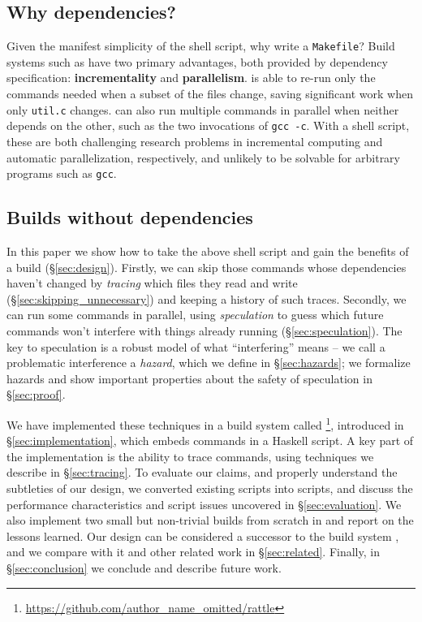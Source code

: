 \subsection{Why dependencies?}

Given the manifest simplicity of the shell script, why write a \texttt{Makefile}? Build systems such as \Make have two primary advantages, both provided by dependency specification: \textbf{incrementality} and \textbf{parallelism}. \Make is able to re-run only the commands needed when a subset of the files change, saving significant work when only \texttt{util.c} changes. \Make can also run multiple commands in parallel when neither depends on the other, such as the two invocations of \texttt{gcc -c}. With a shell script, these are both challenging research problems in incremental computing and automatic parallelization, respectively, and unlikely to be solvable for arbitrary programs such as \texttt{gcc}.

\subsection{Builds without dependencies}

In this paper we show how to take the above shell script and gain the benefits of a \Make build (\S\ref{sec:design}). Firstly, we can skip those commands whose dependencies haven't changed by \emph{tracing} which files they read and write (\S\ref{sec:skipping_unnecessary}) and keeping a history of such traces. Secondly, we can run some commands in parallel, using \emph{speculation} to guess which future commands won't interfere with things already running (\S\ref{sec:speculation}). The key to speculation is a robust model of what ``interfering'' means -- we call a problematic interference a \emph{hazard}, which we define  in \S\ref{sec:hazards}; we formalize hazards and show important properties about the safety of speculation in \S\ref{sec:proof}.

We have implemented these techniques in a build system called \Rattle\footnote{\url{https://github.com/author_name_omitted/rattle}}, introduced in \S\ref{sec:implementation}, which embeds commands in a Haskell script. A key part of the implementation is the ability to trace commands, using techniques we describe in \S\ref{sec:tracing}. To evaluate our claims, and properly understand the subtleties of our design, we converted existing \Make scripts into \Rattle scripts, and discuss the performance characteristics and \Make script issues uncovered in \S\ref{sec:evaluation}. We also implement two small but non-trivial builds from scratch in \Rattle and report on the lessons learned. Our design can be considered a successor to the \Memoize build system \cite{memoize}, and we compare \Rattle with it and other related work in \S\ref{sec:related}. Finally, in \S\ref{sec:conclusion} we conclude and describe future work.
